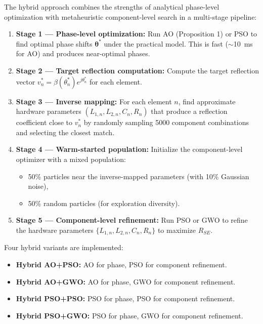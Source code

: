 \documentclass[12pt,a4paper]{article}
\newcommand{\vect}[1]{\boldsymbol{#1}}
\begin{document}
The hybrid approach combines the strengths of analytical phase-level optimization with metaheuristic component-level search in a multi-stage pipeline:

\begin{enumerate}
    \item \textbf{Stage 1 --- Phase-level optimization:} Run AO (Proposition 1) or PSO to find optimal phase shifts $\vect{\theta}^*$ under the practical model. This is fast ($\sim$10~ms for AO) and produces near-optimal phases.

    \item \textbf{Stage 2 --- Target reflection computation:} Compute the target reflection vector $v_n^* = \beta(\theta_n^*) e^{j\theta_n^*}$ for each element.

    \item \textbf{Stage 3 --- Inverse mapping:} For each element $n$, find approximate hardware parameters $(L_{1,n}, L_{2,n}, C_n, R_n)$ that produce a reflection coefficient close to $v_n^*$ by randomly sampling 5000 component combinations and selecting the closest match.

    \item \textbf{Stage 4 --- Warm-started population:} Initialize the component-level optimizer with a mixed population:
    \begin{itemize}
        \item 50\% particles near the inverse-mapped parameters (with 10\% Gaussian noise),
        \item 50\% random particles (for exploration diversity).
    \end{itemize}

    \item \textbf{Stage 5 --- Component-level refinement:} Run PSO or GWO to refine the hardware parameters $\{L_{1,n}, L_{2,n}, C_n, R_n\}$ to maximize $R_{SE}$.
\end{enumerate}

Four hybrid variants are implemented:
\begin{itemize}
    \item \textbf{Hybrid AO+PSO:} AO for phase, PSO for component refinement.
    \item \textbf{Hybrid AO+GWO:} AO for phase, GWO for component refinement.
    \item \textbf{Hybrid PSO+PSO:} PSO for phase, PSO for component refinement.
    \item \textbf{Hybrid PSO+GWO:} PSO for phase, GWO for component refinement.
\end{itemize}
\end{document}
